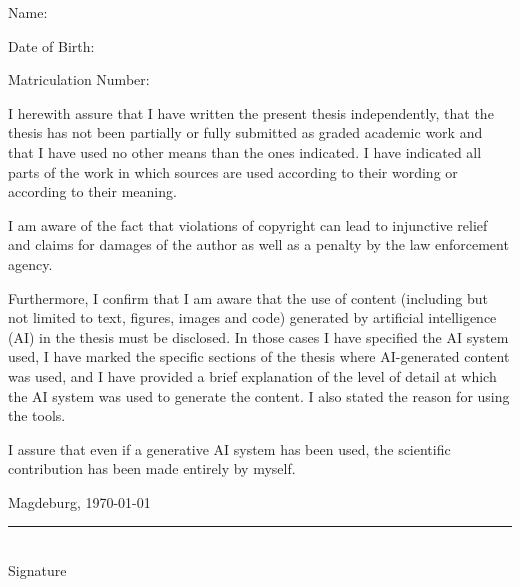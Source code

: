 \documentclass[
	12pt,
	a4paper,
	abstract,
	bibliography=totoc,
	chapterprefix,
	headings=openright,
	numbers=endperiod,
	parskip=half,
	twoside,
]{scrreprt}
\begin{document}
Name:

\bigskip

Date of Birth:

\bigskip

Matriculation Number:

\bigskip
\bigskip

I herewith assure that I have written the present thesis independently, that the thesis has not been partially or fully submitted as graded academic work and that I have used no other means than the ones indicated.
I have indicated all parts of the work in which sources are used according to their wording or according to their meaning.

I am aware of the fact that violations of copyright can lead to injunctive relief and claims for damages of the author as well as a penalty by the law enforcement agency.

Furthermore, I confirm that I am aware that the use of content (including but not limited to text, figures, images and code) generated by artificial intelligence (AI) in the thesis must be disclosed.
In those cases I have specified the AI system used, I have marked the specific sections of the thesis where AI-generated content was used, and I have provided a brief explanation of the level of detail at which the AI system was used to generate the content.
I also stated the reason for using the tools.

I assure that even if a generative AI system has been used, the scientific contribution has been made entirely by myself.

\bigskip

Magdeburg, \today

\bigskip
\bigskip

\rule{0.5\textwidth}{0.5pt}\\
\hspace*{0.25em}Signature
\end{document}
